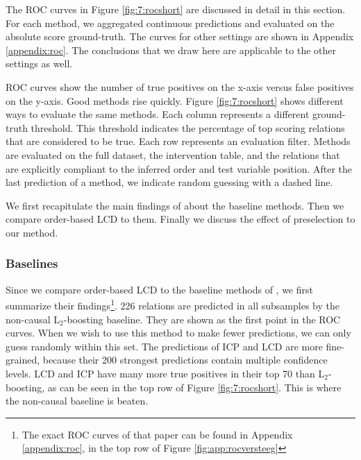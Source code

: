 The ROC curves in Figure \ref{fig:7:rocshort} are discussed in detail in this section. For each method, we aggregated continuous predictions and evaluated on the absolute score ground-truth. The curves for other settings are shown in Appendix \ref{appendix:roc}. The conclusions that we draw here are applicable to the other settings as well. 

ROC curves show the number of true positives on the x-axis versus false positives on the y-axis. Good methods rise quickly. Figure \ref{fig:7:rocshort} shows different ways to evaluate the same methods. Each column represents a different ground-truth threshold. This threshold indicates the percentage of top scoring relations that are considered to be true. Each row represents an evaluation filter. Methods are evaluated on the full dataset, the intervention table, and the relations that are explicitly compliant to the inferred order and test variable position. After the last prediction of a method, we indicate random guessing with a dashed line.

We first recapitulate the main findings of \citet{versteeg2019boosting} about the baseline methods. Then we compare order-based LCD to them. Finally we discuss the effect of preselection to our method.


\subsubsection{Baselines}

Since we compare order-based LCD to the baseline methods of \citet{versteeg2019boosting}, we first summarize their findings\footnote{The exact ROC curves of that paper can be found in Appendix \ref{appendix:roc}, in the top row of Figure \ref{fig:app:rocversteeg}}. 226 relations are predicted in all subsamples by the non-causal L$_2$-boosting baseline. They are shown as the first point in the ROC curves. When we wish to use this method to make fewer predictions, we can only guess randomly within this set. The predictions of ICP and LCD are more fine-grained, because their 200 strongest predictions contain multiple confidence levels. LCD and ICP have many more true positives in their top 70 than L$_2$-boosting, as can be seen in the top row of Figure \ref{fig:7:rocshort}. This is where the non-causal baseline is beaten.


